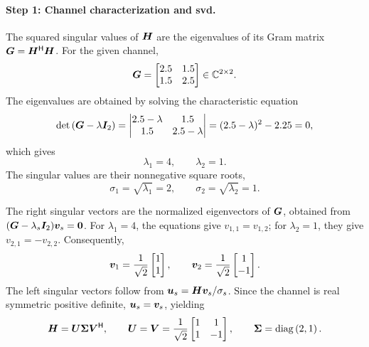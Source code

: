 \paragraph{Step 1: Channel characterization and \ac{svd}.}
The squared singular values of $\bm{H}$ are the eigenvalues of its Gram matrix $\bm{G}={\bm{H}}^{\mathsf{H}}\bm{H}$. For the given channel,
\begin{equation*}
	\bm{G}=
	\begin{bmatrix}
		2.5&1.5\\
		1.5&2.5
	\end{bmatrix}
	\in\mathbb{C}^{2\times2}.
\end{equation*}
The eigenvalues are obtained by solving the characteristic equation
\begin{equation*}
	\operatorname{det}\left(\bm{G}-\lambda\bm{I}_2\right)
	=\begin{vmatrix}
		2.5-\lambda&1.5\\
		1.5&2.5-\lambda
	\end{vmatrix}
	=(2.5-\lambda)^2-2.25=0,
\end{equation*}
which gives
\begin{equation*}
	\lambda_1=4,\qquad \lambda_2=1.
\end{equation*}
The singular values are their nonnegative square roots,
\begin{equation*}
	\sigma_1=\sqrt{\lambda_1}=2,\qquad
	\sigma_2=\sqrt{\lambda_2}=1.
\end{equation*}

The right singular vectors are the normalized eigenvectors of $\bm{G}$, obtained from $(\bm{G}-\lambda_s\bm{I}_2)\bm{v}_s=\bm{0}$. For $\lambda_1=4$, the equations give $v_{1,1}=v_{1,2}$; for $\lambda_2=1$, they give $v_{2,1}=-v_{2,2}$. Consequently,
\begin{equation*}
	\bm{v}_1=\frac1{\sqrt2}\begin{bmatrix}1\\1\end{bmatrix},
	\qquad
	\bm{v}_2=\frac1{\sqrt2}\begin{bmatrix}1\\-1\end{bmatrix}.
\end{equation*}
The left singular vectors follow from $\bm{u}_s=\bm{H}\bm{v}_s/\sigma_s$. Since the channel is real symmetric positive definite, $\bm{u}_s=\bm{v}_s$, yielding
\begin{equation}
	\bm{H}=\bm{U}\bm{\Sigma}{\bm{V}}^{\mathsf{H}},
	\qquad
	\bm{U}=\bm{V}=\frac1{\sqrt2}
	\begin{bmatrix}1&1\\1&-1\end{bmatrix},
	\qquad
	\bm{\Sigma}=\operatorname{diag}\left(2,1\right).
	\label{eq06:p2p-svd}
\end{equation}

